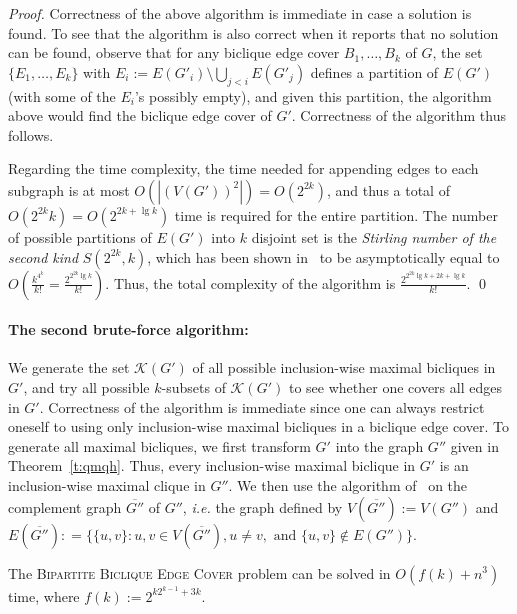 \begin{proof}
Correctness of the above algorithm is immediate in case a
solution is found. To see that the algorithm is also correct
when it reports that no solution can be found, observe that for
any biclique edge cover $B_1,\ldots,B_k$ of $G$, the set
$\{E_1,\ldots,E_k\}$ with $E_i := E(G'_i) \setminus \bigcup_{j <
i} E(G'_j)$ defines a partition of $E(G')$ (with some of the $E_i$'s
possibly empty), and given this partition, the algorithm above
would find the biclique edge cover of $G'$. Correctness of the
algorithm thus follows.

Regarding the time complexity, the time needed for appending
edges to each subgraph is at most $O(|(V(G'))^2|)=O(2^{2k})$, and thus
a total of $O(2^{2k}k)=O(2^{2k+\lg k})$ time is required for the entire partition. The 
number of possible partitions of $E(G')$ into $k$ disjoint set
is the \emph{Stirling number of the second kind} $S(2^{2k},k)$,
which has been shown in~\cite{Korshunov1983} to be
asymptotically equal to
$O(\frac{k^{4^k}}{k!} = \frac{2^{2^{2k}\lg k}}{k!})$. Thus, the 
total complexity of the algorithm is $\frac{2^{2^{2k}\lg k+2k+\lg k}}{k!}$. 
\qed
\end{proof}


\paragraph{The second brute-force algorithm:}
We generate
the set $\mathcal{K}(G')$ of all possible inclusion-wise maximal
bicliques in $G'$, and try all possible $k$-subsets of
$\mathcal{K}(G')$ to see whether one covers all edges in $G'$.
Correctness of the algorithm is immediate
since one can always restrict oneself to using only
inclusion-wise maximal bicliques in a biclique
edge cover. To generate all maximal
bicliques, we first transform $G'$ into the graph $G''$ given in
Theorem~\ref{t:qmqh}. Thus, every
inclusion-wise maximal biclique in $G'$ is an inclusion-wise
maximal clique in $G''$. We then use the algorithm
of~\cite{TsukiyamaIdeAriyoshiShirakawa1977} on the complement
graph $\overline{G''}$ of $G''$, \emph{i.e.} the graph defined
by $V(\overline{G''}):=V(G'')$ and $E(\overline{G''}) : =
\{\{u,v\} : u,v \in V(\overline{G''}), u \neq v, \textrm{ and }
\{u,v\} \notin E(G'') \}$.

\begin{theorem}
The \textsc{Bipartite Biclique Edge Cover} problem can be
solved in $O(f(k) + n^3)$ time, where $f(k):=2^{k2^{k-1}+3k}$.
\end{theorem}

